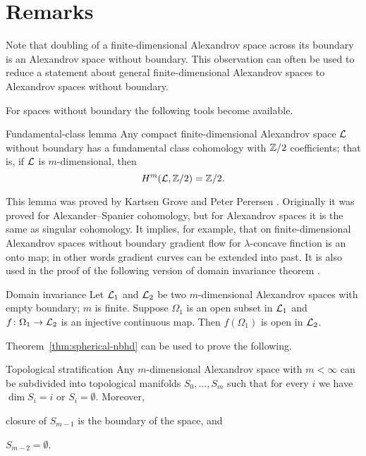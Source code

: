 \section{Remarks}

Note that doubling of a finite-dimensional Alexandrov space across its boundary is an Alexandrov space without boundary.
This observation can often be used to reduce a statement about general finite-dimensional Alexandrov spaces to  Alexandrov spaces without boundary.

For spaces without boundary the following tools become available.

\begin{thm}{Fundamental-class lemma}\label{lem:fund-class}
Any compact finite-dimensional Alexandrov space $\mathcal{L}$ without boundary has a fundamental class cohomology with $\mathbb{Z}/2$ coefficients;
that is, if $\mathcal{L}$ is $m$-dimensional, then
\[H^m(\mathcal{L},\mathbb{Z}/2)=\mathbb{Z}/2.\]

\end{thm}

This lemma was proved by Kartsen Grove and Peter Perersen \cite{grove-petersen}.
Originally it was proved for Alexander--Spanier cohomology, but for Alexandrov spaces it is the same as singular cohomology.
It implies, for example, that on finite-dimensional Alexandrov spaces without boundary 
gradient flow for $\lambda$-concave finction is an onto map;
in other words gradient curves can be extended into past.
It is also used in the proof of the following version of domain invariance theorem \cite[Theorem 3.2]{kapovitch-zhu}.

\begin{thm}{Domain invariance}\label{thm-inv-domain}
Let $\mathcal{L}_1$ and $\mathcal{L}_2$ be two $m$-dimensional Alexandrov spaces with empty boundary; $m$ is finite.
Suppose $\Omega_1$ is an open subset in $\mathcal{L}_1$ and $f\colon\Omega_1\to \mathcal{L}_2$ is an injective continuous map.
Then $f(\Omega_1)$ is open in $\mathcal{L}_2$.
\end{thm}

Theorem~\ref{thm:spherical-nbhd} can be used to prove the following. 

\begin{thm}{Topological stratification}\label{thm:top-stratification}
Any $m$-dimensional Alexandrov space with $m<\infty$ can be subdivided into topological manifolds $S_0,\dots,S_m$ such that for every $i$ we have $\dim S_i=i$ or $S_i=\emptyset$.
Moreover,
\begin{subthm}{}
closure of $S_{m-1}$ is the boundary of the space, and
\end{subthm}

\begin{subthm}{}
$S_{m-2}=\emptyset$.
\end{subthm}

\end{thm}

